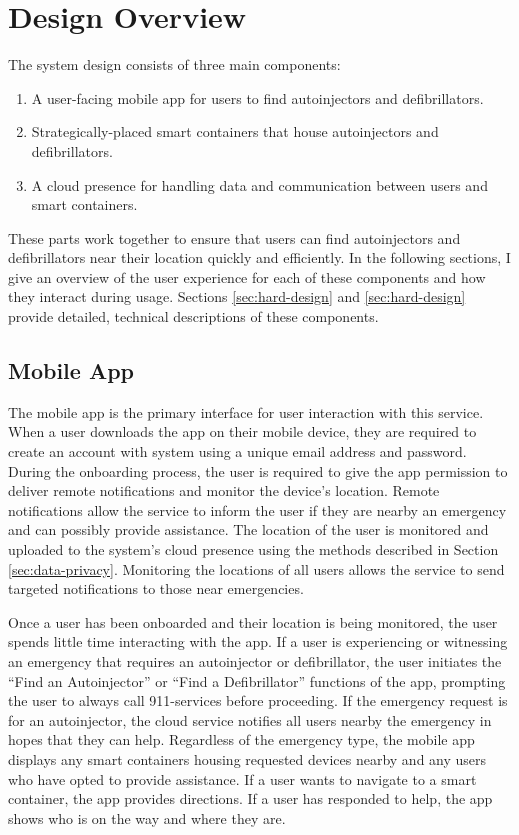 \section{Design Overview} \label{sec:overview}

\onehalfspacing

The system design consists of three main components:
\begin{enumerate}
    \item A user-facing mobile app for users to find autoinjectors and defibrillators.
    \item Strategically-placed smart containers that house autoinjectors and defibrillators.
    \item A cloud presence for handling data and communication between users and smart containers.
\end{enumerate}
These parts work together to ensure that users can find autoinjectors and defibrillators near their location quickly and efficiently. In the following sections, I give an overview of the user experience for each of these components and how they interact during usage. Sections \ref{sec:hard-design} and \ref{sec:hard-design} provide detailed, technical descriptions of these components.

\subsection{Mobile App}

The mobile app is the primary interface for user interaction with this service. When a user downloads the app on their mobile device, they are required to create an account with system using a unique email address and password. During the onboarding process, the user is required to give the app permission to deliver remote notifications and monitor the device's location. Remote notifications allow the service to inform the user if they are nearby an emergency and can possibly provide assistance. The location of the user is monitored and uploaded to the system's cloud presence using the methods described in Section \ref{sec:data-privacy}. Monitoring the locations of all users allows the service to send targeted notifications to those near emergencies.

Once a user has been onboarded and their location is being monitored, the user spends little time interacting with the app. If a user is experiencing or witnessing an emergency that requires an autoinjector or defibrillator, the user initiates the ``Find an Autoinjector'' or ``Find a Defibrillator'' functions of the app, prompting the user to always call 911-services before proceeding. If the emergency request is for an autoinjector, the cloud service notifies all users nearby the emergency in hopes that they can help. Regardless of the emergency type, the mobile app displays any smart containers housing requested devices nearby and any users who have opted to provide assistance. If a user wants to navigate to a smart container, the app provides directions. If a user has responded to help, the app shows who is on the way and where they are.

